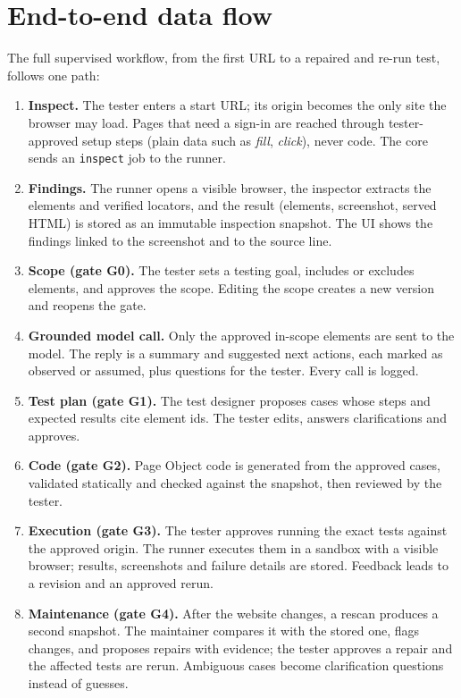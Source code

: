 \documentclass[11pt,a4paper]{article}
\newcommand{\code}[1]{\texttt{#1}}
\begin{document}
\section{End-to-end data flow}
\label{sec:flow}
The full supervised workflow, from the first URL to a repaired and re-run test, follows one path:
\begin{enumerate}
  \item \textbf{Inspect.} The tester enters a start URL; its origin becomes the only site the browser may load. Pages that need a sign-in are reached through tester-approved setup steps (plain data such as \emph{fill}, \emph{click}), never code. The core sends an \code{inspect} job to the runner.
  \item \textbf{Findings.} The runner opens a visible browser, the inspector extracts the elements and verified locators, and the result (elements, screenshot, served HTML) is stored as an immutable inspection snapshot. The UI shows the findings linked to the screenshot and to the source line.
  \item \textbf{Scope (gate G0).} The tester sets a testing goal, includes or excludes elements, and approves the scope. Editing the scope creates a new version and reopens the gate.
  \item \textbf{Grounded model call.} Only the approved in-scope elements are sent to the model. The reply is a summary and suggested next actions, each marked as observed or assumed, plus questions for the tester. Every call is logged.
  \item \textbf{Test plan (gate G1).} The test designer proposes cases whose steps and expected results cite element ids. The tester edits, answers clarifications and approves.
  \item \textbf{Code (gate G2).} Page Object code is generated from the approved cases, validated statically and checked against the snapshot, then reviewed by the tester.
  \item \textbf{Execution (gate G3).} The tester approves running the exact tests against the approved origin. The runner executes them in a sandbox with a visible browser; results, screenshots and failure details are stored. Feedback leads to a revision and an approved rerun.
  \item \textbf{Maintenance (gate G4).} After the website changes, a rescan produces a second snapshot. The maintainer compares it with the stored one, flags changes, and proposes repairs with evidence; the tester approves a repair and the affected tests are rerun. Ambiguous cases become clarification questions instead of guesses.
\end{enumerate}
\end{document}
